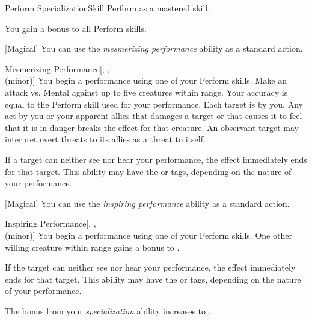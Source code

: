     \begin{feat}{Perform Specialization}{Skill}
        \featpre Perform as a mastered skill.

         You gain a  bonus to all Perform skills.

        [Magical] You can use the \textit{mesmerizing performance} ability as a standard action.
        \begin{apability}{Mesmerizing Performance}[, ,\\ (minor)]
            You begin a performance using one of your Perform skills.
            Make an attack vs. Mental against up to five creatures within \rngmed range.
            Your accuracy is equal to the Perform skill used for your performance.
            \hit Each target is \fascinated by you.
            Any act by you or your apparent allies that damages a target or that causes it to feel that it is in danger breaks the effect for that creature.
            An observant target may interpret overt threats to its allies as a threat to itself.

            If a target can neither see nor hear your performance, the effect immediately ends for that target.
            This ability may have the  or  tags, depending on the nature of your performance.
        \end{apability}

        [Magical] You can use the \textit{inspiring performance} ability as a standard action.
        \begin{apability}{Inspiring Performance}[, ,\\ (minor)]
            You begin a performance using one of your Perform skills.
            One other willing creature within \rngmed range gains a  bonus to .

            If the target can neither see nor hear your performance, the effect immediately ends for that target.
            This ability may have the  or  tags, depending on the nature of your performance.
        \end{apability}

         The bonus from your \textit{specialization} ability increases to .


\end{feat}
